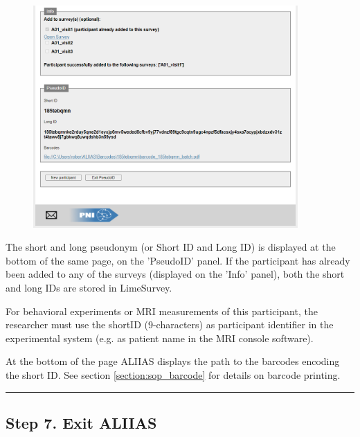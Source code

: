 \small\setlength\fboxsep{5pt}\setlength\fboxrule{1pt}

\begin{figure}[H]
\includegraphics[width=0.9\textwidth]{docs/fig/05_pseudonym.PNG}
\end{figure}

The short and long pseudonym (or Short ID and Long ID) is displayed at the bottom of the same page, on the 'PseudoID' panel. If the participant has already been added to any of the surveys (displayed on the 'Info' panel), both the short and long IDs are stored in LimeSurvey. 

For behavioral experiments or MRI measurements of this participant, the researcher must use the shortID (9-characters) as participant identifier in the experimental system (e.g. as patient name in the MRI console software).

At the bottom of the page ALIIAS displays the path to the barcodes encoding the short ID. See section \ref{section:sop_barcode} for details on barcode printing.

\par\noindent\rule{\textwidth\color{pniblue}}{0.4pt}
\subsection*{Step 7. Exit ALIIAS}

